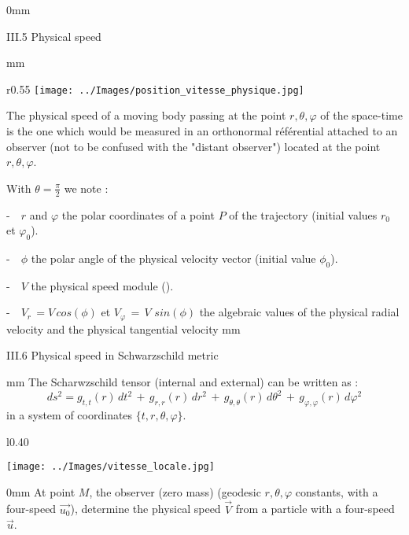 \documentclass [12pt]{article}
\def\ph#1{\hskip #1}
\def\pv#1{\vskip #1}
\begin{document}
	\pv 50mm	
		
		\hypertarget{ancre10}{{\bidon III.5  Physical speed}} \pv 8mm

\begin{wrapfigure}[9]{r}{0.55\textwidth}   %
 \vspace{-2.7cm}
  \centering
    \texttt{[image: ../Images/position\_vitesse\_physique.jpg]}
  \end{wrapfigure}

The physical speed of a moving body passing at the point $r,\theta,\varphi$ of the space-time is the one which would be measured in an orthonormal r\'ef\'erential
attached to an observer (not to be confused with the "distant observer") located at the point  $r,\theta,\varphi$.

With  $\theta=\displaystyle\frac{\pi}{2} $ we note :

-\ \ $r$ and $\varphi$ the polar coordinates of a point $P$ of the trajectory (initial values $r_0$ et $\varphi_0$).

-\ \ $\phi$  the polar angle of the physical velocity vector (initial value $\phi_0$).

-\ \ $V$ the physical speed module (\fcolorbox{black}{green}{$v_0=V(r_0)\ph 5mm \phi_0=\phi(r_0)$}).

-\ \  $V_r\,=V\,cos(\phi)$ et $V_\varphi\,=\,V\,\,sin(\phi)$ the algebraic values of the physical radial velocity and the physical tangential velocity 
\pv 5mm
		
				\hypertarget{ancre11}{{\bidon III.6  Physical speed in Schwarzschild metric}} \pv 3mm
The Scharwzschild tensor (internal and external) can be written as :
 $$ds^2= g_{t,t}(r)\,dt^2\,+\,g_{r,r}(r)\,dr^2\,+ \,g_{\theta,\theta}(r)\,d{\theta}^2\,+\, g_{\varphi,\varphi}(r)\,d{\varphi}^2 $$
in a system of coordinates $\{t,r,\theta,\varphi\}$.

\begin{wrapfigure}{l}{0.40\textwidth}
 \vspace{-30pt}
  \begin{center}
    \texttt{[image: ../Images/vitesse\_locale.jpg]}
  \end{center}
\end{wrapfigure}

\ph 10mm At point $M$, the observer (zero mass) (geodesic $r, \theta, \varphi$ constants, with a four-speed $\vec {u_0}$), 
determine the physical speed $\vec {V}$ from a particle with a four-speed $\vec u$.	
\end{document}
